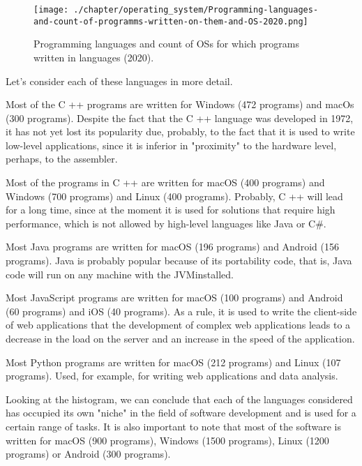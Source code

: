 \begin{figure*}[h!]
	\texttt{[image: ./chapter/operating\_system/Programming-languages-and-count-of-programms-written-on-them-and-OS-2020.png]}
	\caption{Programming languages and count of OSs for which programs written in languages (2020).}
	\label{fig:count-software-written-on-languages}
\end{figure*}

Let's consider each of these languages in more detail.

Most of the C ++ programs are written for Windows (472 programs) and macOs (300 programs). Despite the fact that the C ++ language was developed in 1972, it has not yet lost its popularity due, probably, to the fact that it is used to write low-level applications, since it is inferior in "proximity" to the hardware level, perhaps, to the assembler.

Most of the programs in C ++ are written for macOS (400 programs) and Windows (700 programs) and Linux (400 programs). Probably, C ++ will lead for a long time, since at the moment it is used for solutions that require high performance, which is not allowed by high-level languages like Java or C\#.

Most Java programs are written for macOS (196 programs) and Android (156 programs). Java is probably popular because of its portability\footnotemark {}
code, that is, Java code will run on any machine with the JVM\footnotemark installed.

Most JavaScript programs are written for macOS (100 programs) and Android (60 programs) and iOS (40 programs). As a rule, it is used to write the client-side of web applications that the development of complex web applications leads to a decrease in the load on the server and an increase in the speed of the application.

Most Python programs are written for macOS (212 programs) and Linux (107 programs). Used, for example, for writing web applications and data analysis.

Looking at the histogram, we can conclude that each of the languages considered has occupied its own "niche" in the field of software development and is used for a certain range of tasks. It is also important to note that most of the software is written for macOS (900 programs), Windows (1500 programs), Linux (1200 programs) or Android (300 programs).